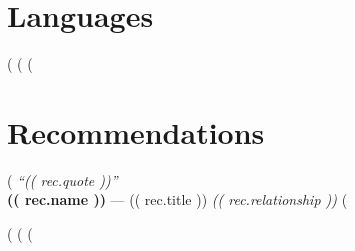 \documentclass[9pt]{article}
\begin{document}
\section*{Languages}
\noindent(%
(%
(%
\section*{Recommendations}
(%
\noindent\textit{``(( rec.quote ))''} \\
\noindent\textbf{(( rec.name ))} --- (( rec.title )) \textit{(( rec.relationship ))}
(%

\vspace{0.5em}

(%
(%
(%
\end{document}
